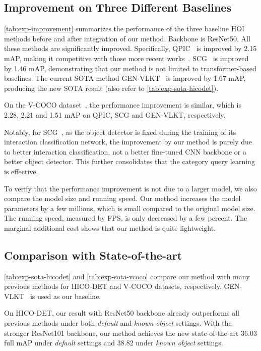 \documentclass[10pt,twocolumn,letterpaper]{article}
\begin{document}
\subsection{Improvement on Three Different Baselines}
\label{subsec:compare-baseline}
\cref{tab:exp-improvement} summarizes the performance of the three baseline HOI methods before and after integration of our method. Backbone is ResNet50. All these methods are significantly improved. Specifically, QPIC~\cite{tamura2021qpic} is improved by 2.15 mAP, making it competitive with those more recent works~\cite{kim2022mstr, zhang2021mining, zhang2022upt}. SCG~\cite{zhang2021spatially} is improved by 1.46 mAP, demonstrating that our method is not limited to transformer-based baselines. The current SOTA method GEN-VLKT~\cite{liao2022gen} is improved by 1.67 mAP, producing the new SOTA result (also refer to \cref{tab:exp-sota-hicodet}).

On the V-COCO dataset~\cite{gupta2015visual}, the performance improvement is similar, which is 2.28, 2.21 and 1.51 mAP on QPIC, SCG and GEN-VLKT, respectively.

Notably, for SCG~\cite{zhang2021spatially}, as the object detector is fixed during the training of its interaction classification network, the improvement by our method is purely due to better interaction classification, not a better fine-tuned CNN backbone or a better object detector. This further consolidates that the category query learning is effective.

To verify that the performance improvement is not due to a larger model, we also compare the model size and running speed. Our method increases the model parameters by a few millions, which is small compared to the original model size. The running speed, measured by FPS, is only decreased by a few percent. The marginal additional cost shows that our method is quite lightweight.

\subsection{Comparison with State-of-the-art}
\label{subsec:compare-sota}
\cref{tab:exp-sota-hicodet} and \cref{tab:exp-sota-vcoco} compare our method with many previous methods for HICO-DET and V-COCO datasets, respectively. GEN-VLKT~\cite{liao2022gen} is used as our baseline.

On HICO-DET, our result with ResNet50 backbone already outperforms all previous methods under both \textit{default} and \textit{known object} settings. With the stronger ResNet101 backbone, our method achieves the new state-of-the-art 36.03 full mAP under \textit{default} settings and 38.82 under \textit{known object} settings.
\end{document}
